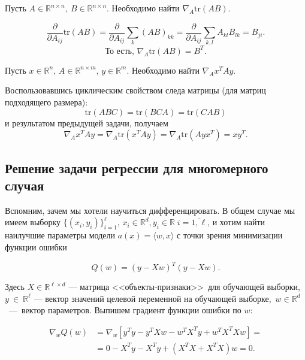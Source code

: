 \documentclass[12pt,fleqn]{article}
\begin{document}
\newpage 
\begin{vkProblem} Пусть $A \in \mathbb{R}^{n \times n},\ B \in \mathbb{R}^{n \times n}$. Необходимо найти $\nabla_A \text{tr}(AB)$. 
\end{vkProblem}

\begin{esSolution}
    
\[
\frac{\partial}{\partial A_{ij}} \text{tr}(AB) = \frac{\partial}{\partial A_{ij}} \sum_k (AB)_{kk} = \frac{\partial}{\partial A_{ij}} \sum_{k,l} A_{kl}B_{lk} = B_{ji}.
\]
\[
\text{То есть, }\nabla_A \text{tr}(AB) = B^T.
\]

\end{esSolution}

\begin{vkProblem} Пусть $x \in \mathbb{R}^n, \, A \in \mathbb{R}^{n \times m}, \, y \in \mathbb{R}^m.$ Необходимо найти $\nabla_A x^TAy$. 
\end{vkProblem}

\begin{esSolution} Воспользовавшись циклическим свойством следа матрицы (для матриц подходящего размера): 
\[
\text{tr}(ABC) = \text{tr}(BCA) = \text{tr}(CAB)
\]
	и результатом предыдущей задачи, получаем
\[
\nabla_A x^TAy = \nabla_A \text{tr} (x^TAy) =  \nabla_A \text{tr}(Ayx^T) = xy^T.
\]
    
\end{esSolution}

\subsection{Решение задачи регрессии для многомерного случая}

Вспомним, зачем мы хотели научиться дифференцировать. В общем случае мы имеем выборку $\{(x_i, y_i)\}_{i=1}^\ell$, $x_i \in \mathbb{R}^d, y_i \in \mathbb{R} \; i = \overline{1, \ell}$, и хотим найти наилучшие параметры модели $a(x) = \langle w, x \rangle$ с точки зрения минимизации функции ошибки

$$Q(w) = (y - Xw)^T(y - Xw).$$

Здесь $X\in \mathbb{R}^{\ell \times d}$ — матрица <<объекты-признаки>>\ для обучающей выборки, $y~\in~\mathbb{R}^\ell$ — вектор значений целевой переменной на обучающей выборке,~$w \in \mathbb{R}^d$~—~вектор параметров. Выпишем градиент функции ошибки по $w$:

\begin{align*}
\nabla_w Q(w) & = \nabla_w [y^Ty - y^TXw - w^TX^Ty + w^TX^TXw] = \\
& = 0 - X^Ty - X^Ty + (X^TX + X^TX)w = 0.
\end{align*}
\end{document}
